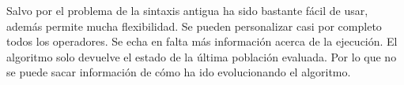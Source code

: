 Salvo por el problema de la sintaxis antigua ha sido bastante fácil de usar, además permite mucha flexibilidad. Se pueden personalizar casi por 
completo todos los operadores. Se echa en falta más información acerca de la ejecución. El algoritmo solo devuelve el estado de la última población
evaluada. Por lo que no se puede sacar información de cómo ha ido evolucionando el algoritmo.